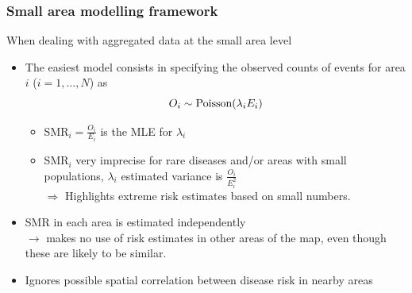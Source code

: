 \documentclass[slidestop,compress,serif,10pt]{beamer}
\begin{document}
\begin{frame}\frametitle{Small area modelling framework}
When dealing with aggregated data at the small area level
\begin{itemize}
\item The easiest model consists in specifying the observed counts of events for area $i$ ($i=1,\ldots,N$) as
\begin{equation*} O_i \sim \hbox{Poisson}(\lambda_i E_i) \end{equation*}
 
 \begin{itemize}
 \item SMR$_i= \frac{O_i}{E_i}$ is the MLE for $\lambda_i$
\item SMR$_i$ very imprecise for rare diseases and/or areas with small populations, $\lambda_i$ estimated variance is $\frac{O_i}{E_i^2}$\\
$\Rightarrow$ Highlights extreme risk estimates based on small numbers.
    \end{itemize}
\vspace{0.2cm}
\pause\item SMR in each area is estimated independently\\
$\rightarrow$ makes no use of risk estimates in other areas of the map, even though these are likely to be similar.
\vspace{0.2cm}
\item Ignores possible spatial correlation between disease risk in nearby areas 
\end{itemize}

\pause\centering\color{red}{Bayesian `smoothing' estimators in a hierarchical formulation.}

\end{frame}
\end{document}
